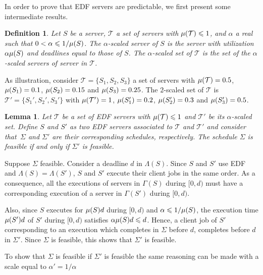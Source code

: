 \documentclass[twocolumn, compsocconf]{IEEEtran}
\newtheorem{lemma}{Lemma}[section]
\newtheorem{definition}{Definition}[section]
\renewcommand{\leq}{\leqslant}
\newcommand{\sched}{\ensuremath{\Sigma}\xspace}
\newcommand{\clientOf}{\ensuremath{\Gamma}\xspace}
\newcommand{\servSet}{\ensuremath{\mathcal{T}}}
\begin{document}
In order to prove that EDF servers are predictable, we first present some
intermediate results.

\begin{definition}\label{dfn:scaling}
  Let $S$ be a server, $\servSet$ a set of servers with $\util(\servSet) \leq
  1$, and $\alpha$ a real such that $0 < \alpha \leq 1 / \util(S)$. The
  $\alpha$-scaled server of $S$ is the server with utilization $\alpha \mu(S)$
  and deadlines equal to those of $S$. The $\alpha$-scaled set of $\servSet$ is
  the set of the $\alpha$-scaled servers of server in $\servSet$.
\end{definition}

As illustration, consider $\servSet= \{ S_1, S_2, S_3 \}$ a set of servers with
$\util(\servSet) = 0.5$, $\mu(S_1) = 0.1$, $\mu(S_2) = 0.15$ and $\mu(S_3)
= 0.25$. The $2$-scaled set of $\servSet$ is $\servSet' = \{ S_1', S_2',
S_3' \}$ with $\util(\servSet') = 1$, $\mu(S_1') = 0.2$, $\mu(S_2') = 0.3$
and $\mu(S_3') = 0.5$.
  
\begin{lemma}\label{lem:scalingEquiv}
  Let $\servSet$ be a set of EDF servers with $\util(\servSet) \leq 1$ and
  $\servSet'$ be its $\alpha$-scaled set. Define $S$ and $S'$ as two EDF servers
  associated to $\servSet$ and $\servSet'$ and consider that $\,\sched$ and
  $\sched'$ are their corresponding schedules, respectively. The schedule
  $\sched$ is feasible if and only if $\sched'$ is feasible.
\end{lemma}
  
\begin{IEEEproof}
  Suppose $\sched$ feasible. Consider a deadline $d$ in $\Lambda(S)$. Since $S$
  and $S'$ use EDF and $\Lambda(S) = \Lambda(S')$, $S$ and $S'$ execute their
  client jobs in the same order. As a consequence, all the executions of servers
  in $\clientOf(S)$ during $[0,d)$ must have a corresponding execution of a
  server in $\clientOf(S')$ during $[0,d)$.

  Also, since $S$ executes for $\mu(S) d$ during $[0,d)$ and $\alpha \leq
  1/\util(S)$, the execution time $\mu(S') d$ of $S'$ during $[0,d)$ satisfies
  $\alpha \util(S) d \leq d$.  Hence, a client job of $S'$ corresponding to an
  execution which completes in $\sched$ before $d$, completes before $d$ in
  $\sched'$. Since $\sched$ is feasible, this shows that $\sched'$ is feasible.

  To show that $\sched$ is feasible if $\sched'$ is feasible the same reasoning
  can be made with a scale equal to $\alpha' = 1/\alpha$
\end{IEEEproof}
\end{document}
